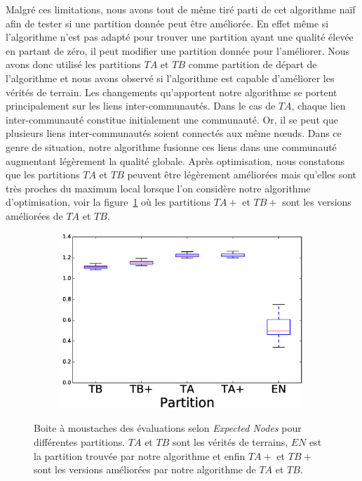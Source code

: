 Malgré ces limitations, nous avons tout de même tiré parti de cet algorithme naïf afin de tester si une partition donnée peut être améliorée.
En effet même si l'algorithme n'est pas adapté pour trouver une partition ayant une qualité élevée en partant de zéro, il peut modifier une partition donnée pour l'améliorer. 
Nous avons donc utilisé les partitions $TA$ et $TB$ comme partition de départ de l'algorithme et nous avons observé si l'algorithme est capable d'améliorer les vérités de terrain.
Les changements qu'apportent notre algorithme se portent principalement sur les liens inter-communautés.
Dans le cas de $TA$, chaque lien inter-communauté constitue initialement une communauté.
Or, il se peut que plusieurs liens inter-communautés soient connectés aux même n\oe{}uds.
Dans ce genre de situation, notre algorithme fusionne ces liens dans une communauté augmentant légèrement la qualité globale.
Après optimisation, nous constatons que les partitions $TA$ et $TB$ peuvent être légèrement améliorées mais qu'elles sont très proches du maximum local lorsque l'on considère notre algorithme d'optimisation,
voir la figure~\ref{fig:LF_bis_EN} où les partitions $TA+$ et $TB+$ sont les versions améliorées de $TA$ et $TB$.
\begin{figure}
\centering
	\begin{subfigure}{0.31\textwidth}
		\includegraphics[width=\linewidth]{img/ExpectedNodes/LF/LFR1_Modified_ALL.eps}
	\end{subfigure}
	
	\caption{Boite à moustaches des évaluations selon \emph{Expected Nodes} pour différentes partitions.
	$TA$ et $TB$ sont les vérités de terrains, $EN$ est la partition trouvée par notre algorithme et enfin $TA+$ et $TB+$ sont les versions améliorées par notre algorithme de $TA$ et $TB$.
	}
	\label{fig:LF_bis_EN}
\end{figure}

